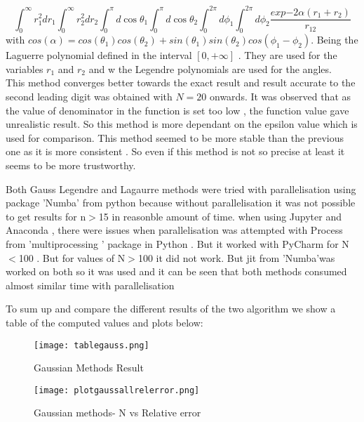 \documentclass[9pt,a4paper,titlepage]{article}
\begin{document}
\begin{equation}
\int_{0}^{\infty} r_1^2dr_1\int_{0}^{\infty} r_2^2dr_2\int_{0}^{\pi}d\cos{\theta_1}\int_{0}^{\pi}d\cos{\theta_2}\int_{0}^{2\pi} d\phi_1\int_{0}^{2\pi} d\phi_2\frac{exp{-2\alpha({r_1+r_2})}}{r_{12}}
\end{equation}
with $cos(\alpha)=cos(\theta_1)cos(\theta_2)+sin(\theta_1)sin(\theta_2)cos(\phi_1-\phi_2)$. Being the Laguerre polynomial defined in the interval $[0,+\infty]$ . They are used for the variables $r_1$ and $r_2$ and w the Legendre polynomials are used for the angles. 
\\
This method converges better towards the exact result  and result accurate to the second leading digit was obtained with  $N=20$  onwards.
It was observed that as the value of denominator in the function is set too low , the function value gave unrealistic result. So this method is more dependant on the epsilon value which is used for comparison.
 This method seemed to be more stable than the previous one as it is more consistent . So even if this method is not so precise at least it seems to be more trustworthy. 

Both Gauss Legendre and Lagaurre methods were tried with parallelisation using package 'Numba' from python because without parallelisation it was not possible to get results for n$>$15 in reasonble amount of time.
when using Jupyter and Anaconda , there were issues when parallelisation was attempted with Process from 'multiprocessing ' package in Python .
But it worked with PyCharm for N$<$100 . But for values of N$>$100 it did not work. 
But jit from 'Numba'was worked on both so it was used and it can be seen that both methods consumed almost similar time with parallelisation 

 To sum up and compare the different results of the two algorithm we show a table of the computed values and plots below:
\begin{center}

\begin{figure}[hbt!]
  \texttt{[image: tablegauss.png]}
  \caption{Gaussian Methods Result}
  \label{fig:MCrelerr}
\end{figure}
\end{center}

\begin{figure}[H]
  \texttt{[image: plotgaussallrelerror.png]}
  \caption{Gaussian methods- N vs Relative error}
  \label{fig:jacobialg}
\end{figure}
\end{document}
